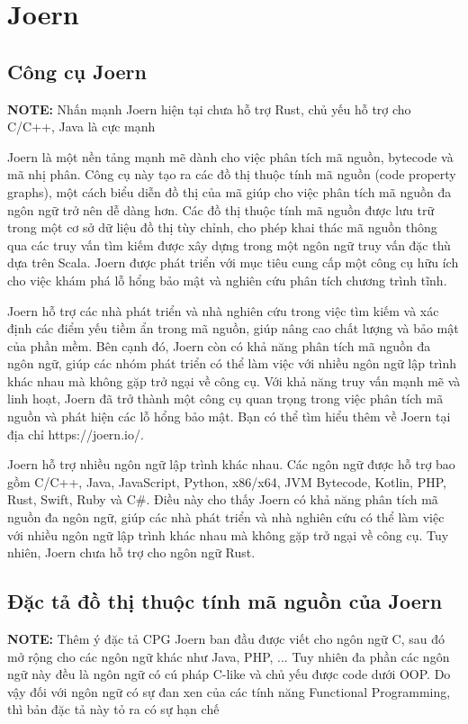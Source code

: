 \section{Joern}

\subsection{Công cụ Joern}

\textbf{NOTE:} Nhấn mạnh Joern hiện tại chưa hỗ trợ Rust, chủ yếu hỗ trợ cho C/C++, Java là cực mạnh

Joern là một nền tảng mạnh mẽ dành cho việc phân tích mã nguồn, bytecode và mã nhị phân. Công cụ này tạo ra các đồ thị thuộc tính mã nguồn (code property graphs), một cách biểu diễn đồ thị của mã giúp cho việc phân tích mã nguồn đa ngôn ngữ trở nên dễ dàng hơn. Các đồ thị thuộc tính mã nguồn được lưu trữ trong một cơ sở dữ liệu đồ thị tùy chỉnh, cho phép khai thác mã nguồn thông qua các truy vấn tìm kiếm được xây dựng trong một ngôn ngữ truy vấn đặc thù dựa trên Scala. Joern được phát triển với mục tiêu cung cấp một công cụ hữu ích cho việc khám phá lỗ hổng bảo mật và nghiên cứu phân tích chương trình tĩnh.

Joern hỗ trợ các nhà phát triển và nhà nghiên cứu trong việc tìm kiếm và xác định các điểm yếu tiềm ẩn trong mã nguồn, giúp nâng cao chất lượng và bảo mật của phần mềm. Bên cạnh đó, Joern còn có khả năng phân tích mã nguồn đa ngôn ngữ, giúp các nhóm phát triển có thể làm việc với nhiều ngôn ngữ lập trình khác nhau mà không gặp trở ngại về công cụ. Với khả năng truy vấn mạnh mẽ và linh hoạt, Joern đã trở thành một công cụ quan trọng trong việc phân tích mã nguồn và phát hiện các lỗ hổng bảo mật. Bạn có thể tìm hiểu thêm về Joern tại địa chỉ https://joern.io/.

Joern hỗ trợ nhiều ngôn ngữ lập trình khác nhau. Các ngôn ngữ được hỗ trợ bao gồm C/C++, Java, JavaScript, Python, x86/x64, JVM Bytecode, Kotlin, PHP, Rust, Swift, Ruby và C\#. Điều này cho thấy Joern có khả năng phân tích mã nguồn đa ngôn ngữ, giúp các nhà phát triển và nhà nghiên cứu có thể làm việc với nhiều ngôn ngữ lập trình khác nhau mà không gặp trở ngại về công cụ.
Tuy nhiên, Joern chưa hỗ trợ cho ngôn ngữ Rust.

\subsection{Đặc tả đồ thị thuộc tính mã nguồn của Joern}

\textbf{NOTE:} Thêm ý đặc tả CPG Joern ban đầu được viết cho ngôn ngữ C, sau đó mở rộng cho các ngôn ngữ khác như Java, PHP, ... Tuy nhiên đa phần các ngôn ngữ này đều là ngôn ngữ có cú pháp C-like và chủ yếu được code dưới OOP. Do vậy đối với ngôn ngữ có sự đan xen của các tính năng Functional Programming, thì bản đặc tả này tỏ ra có sự hạn chế

